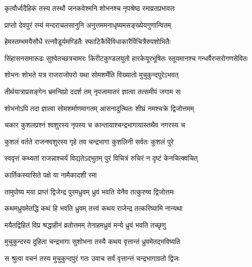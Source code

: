 \twolineshloka
{कृत्वौर्ध्वदैहिकं तस्य तस्थौ जनकवेश्मनि}
{शोभनश्च नृपश्रेष्ठ रमाव्रतप्रभावतः}%

\twolineshloka
{प्राप्तो देवपुरं रम्यं मन्दराचलसानुनि}
{अनुत्तममनाधृष्यमसङ्ख्येयगुणान्वितम्}%

\twolineshloka
{हेमस्तम्भमयैसौधै रत्नवैडूर्यमण्डितैः}
{स्फाटिकैर्विविधाकारैर्विचित्रैरुपशोभितैः}%

\threelineshloka
{सिंहासनसमारूढः सुश्वेतच्छत्रचामरः}
{किरीटकुण्डलयुतो हारकेयूरभूषितः}
{स्तूयमानश्च गन्धर्वैरप्सरोगणसेवितः }%

\twolineshloka
{शोभनः शोभते यत्र राजराजोपरो यथा}
{सोमशर्मेति विख्यातो मुचुकुन्दपुरेऽभवत्}%

\twolineshloka
{तीर्थयात्राप्रसङ्गेन भ्रमन्विप्रो ददर्श तम्}
{नृपजामातरं ज्ञात्वा तत्समीपं जगाम सः}%

\twolineshloka
{शोभनोऽपि तदा ज्ञात्वा सोमशर्माणमागतम्}
{आसनादुत्थितः शीघ्रं नमश्चक्रे द्विजोत्तमम्}%

\twolineshloka
{चकार कुशलप्रश्नं श्वशुरस्य नृपस्य च}
{कान्तायाश्चन्द्रभागायास्तथैव नगरस्य च}%


\twolineshloka
{कुशलं वर्तते राजन्श्वशुरस्य गृहे तव}
{चन्द्रभागा कुशलिनी सर्वतः कुशलं पुरे}%

\twolineshloka
{स्ववृत्तं कथ्यतां राजन्नाश्चर्यं विद्यतेऽद्भुतम्}
{पुरं विचित्रं रुचिरं न दृष्टं केनचित्क्वचित्}%

\onelineshloka
{कार्तिकस्यासिते पक्षे या नामैकादशी रमा}%

\twolineshloka
{तामुपोष्य मया प्राप्तं द्विजेन्द्र पुरमध्रुवम्}
{ध्रुवं भवति येनैव तत्कुरुष्व द्विजोत्तमः}%


\twolineshloka
{कथमध्रुवमेतद्धि कथं हि भवति ध्रुवम्}
{तत्त्वं कथय राजेन्द्र तत्करिष्यामि नान्यथा}%


\twolineshloka
{मयैतद्विहितं विप्र श्रद्धाहीनं व्रतोत्तमम्}
{तेनाहमध्रुवं मन्ये ध्रुवं भवति तच्छृणु}%

\twolineshloka
{मुचुकुन्दस्य दुहिता चन्द्रभागा सुशोभना}
{तस्यै कथय वृत्तान्तं ध्रुवमेतद्भविष्यति}%


\twolineshloka
{स श्रुत्वा वचनं तस्य मुचुकुन्दपुरं गतः}
{उवाच सर्वं वृत्तान्त्तं चन्द्रभागाग्रतो द्विजः}%

